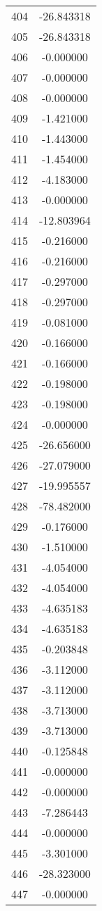 \documentclass[12pt]{article}
\begin{document}
\begin{longtable}{@{}cc@{}}
404 & -26.843318 \\
405 & -26.843318 \\
406 & -0.000000 \\
407 & -0.000000 \\
408 & -0.000000 \\
409 & -1.421000 \\
410 & -1.443000 \\
411 & -1.454000 \\
412 & -4.183000 \\
413 & -0.000000 \\
414 & -12.803964 \\
415 & -0.216000 \\
416 & -0.216000 \\
417 & -0.297000 \\
418 & -0.297000 \\
419 & -0.081000 \\
420 & -0.166000 \\
421 & -0.166000 \\
422 & -0.198000 \\
423 & -0.198000 \\
424 & -0.000000 \\
425 & -26.656000 \\
426 & -27.079000 \\
427 & -19.995557 \\
428 & -78.482000 \\
429 & -0.176000 \\
430 & -1.510000 \\
431 & -4.054000 \\
432 & -4.054000 \\
433 & -4.635183 \\
434 & -4.635183 \\
435 & -0.203848 \\
436 & -3.112000 \\
437 & -3.112000 \\
438 & -3.713000 \\
439 & -3.713000 \\
440 & -0.125848 \\
441 & -0.000000 \\
442 & -0.000000 \\
443 & -7.286443 \\
444 & -0.000000 \\
445 & -3.301000 \\
446 & -28.323000 \\
447 & -0.000000 \\

\end{longtable}
\end{document}
